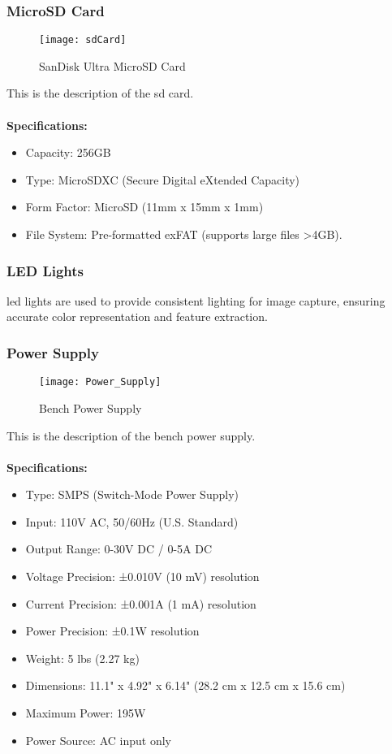\subsubsection{MicroSD Card}
\begin{figure}[!htbp]
	\centering
	\texttt{[image: sdCard]}
	\caption{SanDisk Ultra MicroSD Card}
	\label{fig:sdCard_fig}
\end{figure}
This is the description of the sd card.
\\
\\
\textbf{Specifications:}
\begin{itemize}
    \item Capacity: 256GB
    \item Type: MicroSDXC (Secure Digital eXtended Capacity)
    \item Form Factor: MicroSD (11mm x 15mm x 1mm)
    \item File System: Pre-formatted exFAT (supports large files >4GB).
\end{itemize}

\subsubsection{LED Lights}
\gls{led} lights are used to provide consistent lighting for image capture, ensuring accurate color representation and feature extraction.

\subsubsection{Power Supply}
\begin{figure}[!htbp]
	\centering
	\texttt{[image: Power\_Supply]}
	\caption{Bench Power Supply}
	\label{fig:Power_Supply_fig}
\end{figure}
This is the description of the bench power supply.
\\
\\
\textbf{Specifications:}
\begin{itemize}
    \item Type: SMPS (Switch-Mode Power Supply)
    \item Input: 110V AC, 50/60Hz (U.S. Standard)
    \item Output Range: 0-30V DC / 0-5A DC
    \item Voltage Precision: ±0.010V (10 mV) resolution
    \item Current Precision: ±0.001A (1 mA) resolution
    \item Power Precision: ±0.1W resolution
    \item Weight: 5 lbs (2.27 kg)
    \item Dimensions: 11.1" x 4.92" x 6.14" (28.2 cm x 12.5 cm x 15.6 cm)
    \item Maximum Power: 195W
    \item Power Source: AC input only
\end{itemize}


